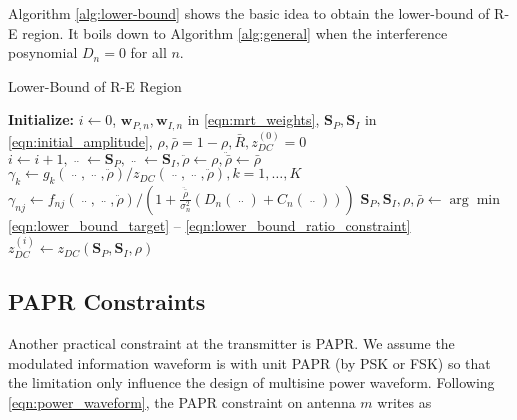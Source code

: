 Algorithm \ref{alg:lower-bound} shows the basic idea to obtain the lower-bound of R-E region. It boils down to Algorithm \ref{alg:general} when the interference posynomial ${D_n} = 0$ for all $n$.

\begin{algorithm}
  \caption{Lower-Bound of R-E Region}
  \label{alg:lower-bound}
  \begin{algorithmic}[1]
    \State \textbf{Initialize:} $i \leftarrow 0$, ${{\mathbf{w}}_{P,n}},{{\mathbf{w}}_{I,n}}$ in \eqref{eqn:mrt_weights}, ${{{\mathbf{S}}_P},{{\mathbf{S}}_I}}$ in \eqref{eqn:initial_amplitude}, $\rho ,\bar \rho  = 1 - \rho ,\bar R,z_{DC}^{(0)} = 0$
    \Repeat
      \State $i \leftarrow i + 1,\mathop {{{\mathbf{S}}_P}}\limits^{..}  \leftarrow {{\mathbf{S}}_P},\mathop {{{\mathbf{S}}_I}}\limits^{..}  \leftarrow {{\mathbf{S}}_I},\ddot \rho  \leftarrow \rho ,\ddot{\bar{\rho}}  \leftarrow \bar \rho $
      \State ${\gamma _k} \leftarrow {g_k}\left( {\mathop {{{\mathbf{S}}_P}}\limits^{..} ,\mathop {{{\mathbf{S}}_I}}\limits^{..} ,\ddot \rho } \right)/{z_{DC}}\left( {\mathop {{{\mathbf{S}}_P}}\limits^{..} ,\mathop {{{\mathbf{S}}_I}}\limits^{..} ,\ddot \rho } \right),k = 1, \ldots ,K$
      \State ${\gamma _{nj}} \leftarrow {f_{nj}}\left( {\mathop {{{\mathbf{S}}_P}}\limits^{..} ,\mathop {{{\mathbf{S}}_I}}\limits^{..} ,\ddot \rho } \right)/\left( {1 + \frac{{\ddot{\bar{\rho}}}}{{\sigma _n^2}}\left( {{D_n}\left( {\mathop {{{\mathbf{S}}_P}}\limits^{..} } \right) + {C_n}\left( {\mathop {{{\mathbf{S}}_I}}\limits^{..} } \right)} \right)} \right)$
      \State ${{\mathbf{S}}_P},{{\mathbf{S}}_I},\rho ,\bar \rho  \leftarrow \arg \min $ \eqref{eqn:lower_bound_target} -- \eqref{eqn:lower_bound_ratio_constraint}
      \State $z_{DC}^{(i)} \leftarrow {z_{DC}}\left( {{{\mathbf{S}}_P},{{\mathbf{S}}_I},\rho } \right)$
  \end{algorithmic}
\end{algorithm}  



\subsection{PAPR Constraints}\label{sec:papr-constraints}
Another practical constraint at the transmitter is PAPR. We assume the modulated information waveform is with unit PAPR (by PSK or FSK) so that the limitation only influence the design of multisine power waveform. Following \ref{eqn:power_waveform}, the PAPR constraint on antenna $m$ writes as

